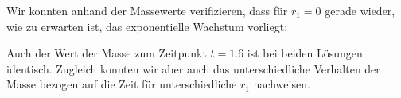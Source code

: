 Wir konnten anhand der Massewerte verifizieren, dass für $r_1 = 0 $  gerade wieder, wie zu erwarten ist, das exponentielle Wachstum vorliegt:
\begin{figure}[H]
	\centering
\end{figure}
Auch der Wert der Masse zum Zeitpunkt $t=1.6$ ist bei beiden Lösungen identisch.
Zugleich konnten wir aber auch das unterschiedliche Verhalten der Masse bezogen auf die Zeit für unterschiedliche $r_1$ nachweisen. 
